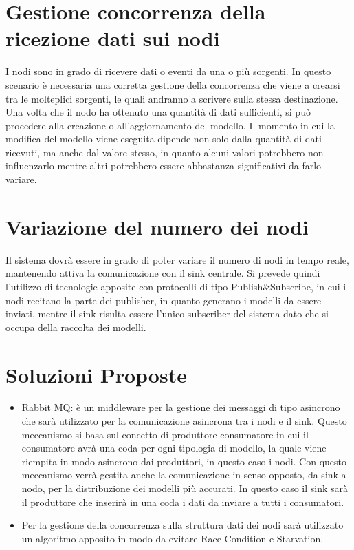   \section{Gestione concorrenza della ricezione dati sui nodi}
		I nodi sono in grado di ricevere dati o eventi da una o più sorgenti. In questo scenario è necessaria una corretta gestione della concorrenza che viene a crearsi tra le molteplici sorgenti, le quali andranno a scrivere sulla stessa destinazione. Una volta che il nodo ha ottenuto una quantità di dati sufficienti, si può procedere alla creazione o all’aggiornamento del modello. Il momento in cui la modifica del modello viene eseguita dipende non solo dalla quantità di dati ricevuti, ma anche dal valore stesso, in quanto alcuni valori potrebbero non influenzarlo mentre altri potrebbero essere abbastanza significativi da farlo variare.

  \section{Variazione del numero dei nodi}
		Il sistema dovrà essere in grado di poter variare il numero di nodi in tempo reale, mantenendo attiva la comunicazione con il sink centrale. Si prevede quindi l’utilizzo di tecnologie apposite con protocolli di tipo Publish\&Subscribe, in cui i nodi recitano la parte dei publisher, in quanto generano i modelli da essere inviati, mentre il sink risulta essere l’unico subscriber del sistema dato che si occupa della raccolta dei modelli.

  \section{Soluzioni Proposte}

    \begin{itemize}
      \item Rabbit MQ: è un middleware per la gestione dei messaggi di tipo asincrono che sarà utilizzato per la comunicazione asincrona tra i nodi e il sink. Questo meccanismo si basa sul concetto di produttore-consumatore in cui il consumatore avrà una coda per ogni tipologia di modello, la quale viene riempita in modo asincrono dai produttori, in questo caso i nodi. Con questo meccanismo verrà gestita anche la comunicazione in senso opposto, da sink a nodo, per la distribuzione dei modelli più accurati. In questo caso il sink sarà il produttore che inserirà in una coda i dati da inviare a tutti i consumatori.
      \item Per la gestione della concorrenza sulla struttura dati dei nodi sarà utilizzato un algoritmo apposito in modo da evitare Race Condition e Starvation.
    \end{itemize}
